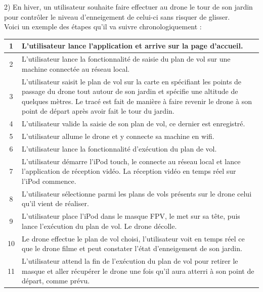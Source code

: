 \documentclass{article}
\begin{document}
        \newpage
         \begin{flushleft}
        2) En hiver, un utilisateur souhaite faire effectuer au drone le tour de son jardin pour contrôler le niveau d'enneigement de celui-ci sans risquer de glisser.\\
        Voici un exemple des étapes qu'il va suivre chronologiquement : \\
         \end{flushleft}
	    \begin{center}
	    \renewcommand{\arraystretch}{2}
        \begin{tabularx}{15cm}{|c|X|}
            \hline
            1 & L'utilisateur lance l'application et arrive sur la page d'accueil.\\
            \hline
            2 & L'utilisateur lance la fonctionnalité de saisie du plan de vol sur une machine connectée au réseau local.\\
            \hline
            3 & L'utilisateur saisit le plan de vol sur la carte en spécifiant les points de passage du drone tout autour de son jardin et spécifie une altitude de quelques mètres. Le tracé est fait de manière à faire revenir le drone à son point de départ après avoir fait le tour du jardin. \\
            \hline
            4 & L'utilisateur valide la saisie de son plan de vol, ce dernier est enregistré. \\
            \hline
            5 & L'utilisateur allume le drone et y connecte sa machine en wifi. \\
            \hline
            6 & L'utilisateur lance la fonctionnalité d'exécution du plan de vol. \\
            \hline
            7 &  L'utilisateur démarre l'iPod touch, le connecte au réseau local et lance l'application de réception vidéo. La réception vidéo en temps réel sur l'iPod commence.\\
            \hline
            8 & L'utilisateur sélectionne parmi les plans de vols présents sur le drone celui qu'il vient de réaliser. \\
            \hline
            9 & L'utilisateur place l'iPod dans le masque FPV, le met sur sa tête, puis lance l'exécution du plan de vol. Le drone décolle. \\
            \hline
            10 & Le drone effectue le plan de vol choisi, l'utilisateur voit en temps réel ce que le drone filme et peut constater l'état d'enneigement de son jardin. \\
            \hline
            11 & L'utilisateur attend la fin de l'exécution du plan de vol pour retirer le masque et aller récupérer le drone une fois qu'il aura atterri à son point de départ, comme prévu.\\
            \hline
        \end{tabularx}
        \end{center}
        
\end{document}
